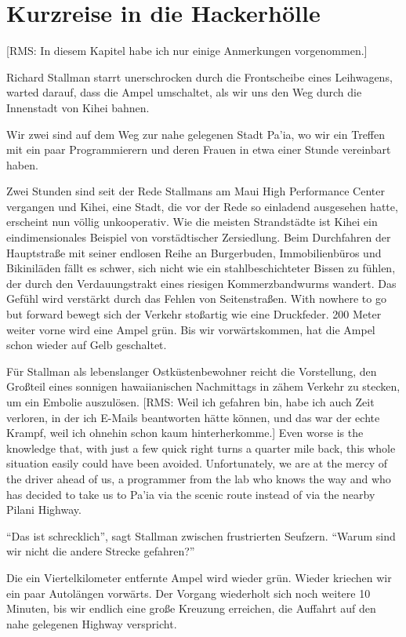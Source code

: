 \chapter{Kurzreise in die Hackerhölle}

[RMS: In diesem Kapitel habe ich nur einige Anmerkungen vorgenommen.]

Richard Stallman starrt unerschrocken durch die Frontscheibe eines Leihwagens, warted darauf, dass die Ampel umschaltet, als wir uns den Weg durch die Innenstadt von Kihei bahnen.

Wir zwei sind auf dem Weg zur nahe gelegenen Stadt Pa'ia, wo wir ein Treffen mit ein paar Programmierern und deren Frauen in etwa einer Stunde vereinbart haben.

Zwei Stunden sind seit der Rede Stallmans am Maui High Performance Center vergangen und Kihei, eine Stadt, die vor der Rede so einladend ausgesehen hatte, erscheint nun völlig unkooperativ. Wie die meisten Strandstädte ist Kihei ein eindimensionales Beispiel von vorstädtischer Zersiedlung. Beim Durchfahren der Hauptstraße mit seiner endlosen Reihe an Burgerbuden, Immobilienbüros und Bikiniläden fällt es schwer, sich nicht wie ein stahlbeschichteter Bissen zu fühlen, der durch den Verdauungstrakt eines riesigen Kommerzbandwurms wandert. Das Gefühl wird verstärkt durch das Fehlen von Seitenstraßen. With nowhere to go but forward bewegt sich der Verkehr stoßartig wie eine Druckfeder. 200 Meter weiter vorne wird eine Ampel grün. Bis wir vorwärtskommen, hat die Ampel schon wieder auf Gelb geschaltet.

Für Stallman als lebenslanger Ostküstenbewohner reicht die Vorstellung, den Großteil eines sonnigen hawaiianischen Nachmittags in zähem Verkehr zu stecken, um ein Embolie auszulösen. [RMS: Weil ich gefahren bin, habe ich auch Zeit verloren, in der ich E-Mails beantworten hätte können, und das war der echte Krampf, weil ich ohnehin schon kaum hinterherkomme.] Even worse is the knowledge that, with just a few quick right turns a quarter mile back, this whole situation easily could have been avoided. Unfortunately, we are at the mercy of the driver ahead of us, a programmer from the lab who knows the way and who has decided to take us to Pa'ia via the scenic route instead of via the nearby Pilani Highway.

"`Das ist schrecklich"', sagt Stallman zwischen frustrierten Seufzern. "`Warum sind wir nicht die andere Strecke gefahren?"'

Die ein Viertelkilometer entfernte Ampel wird wieder grün. Wieder kriechen wir ein paar Autolängen vorwärts. Der Vorgang wiederholt sich noch weitere 10 Minuten, bis wir endlich eine große Kreuzung erreichen, die Auffahrt auf den nahe gelegenen Highway verspricht.


